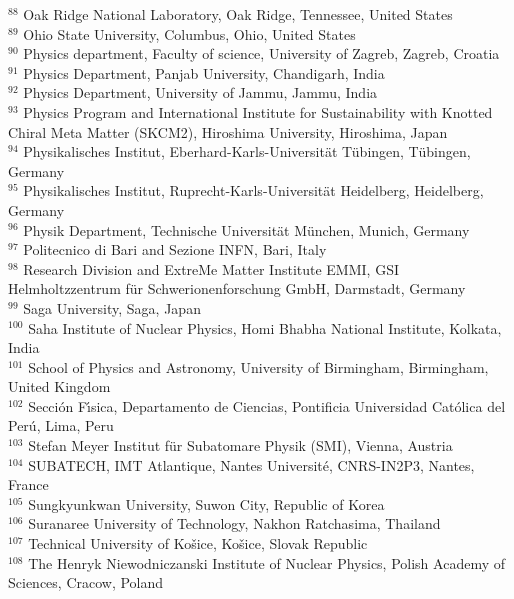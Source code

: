 \begin{flushleft}
$^{88}$ Oak Ridge National Laboratory, Oak Ridge, Tennessee, United States\\
$^{89}$ Ohio State University, Columbus, Ohio, United States\\
$^{90}$ Physics department, Faculty of science, University of Zagreb, Zagreb, Croatia\\
$^{91}$ Physics Department, Panjab University, Chandigarh, India\\
$^{92}$ Physics Department, University of Jammu, Jammu, India\\
$^{93}$ Physics Program and International Institute for Sustainability with Knotted Chiral Meta Matter (SKCM2), Hiroshima University, Hiroshima, Japan\\
$^{94}$ Physikalisches Institut, Eberhard-Karls-Universit\"{a}t T\"{u}bingen, T\"{u}bingen, Germany\\
$^{95}$ Physikalisches Institut, Ruprecht-Karls-Universit\"{a}t Heidelberg, Heidelberg, Germany\\
$^{96}$ Physik Department, Technische Universit\"{a}t M\"{u}nchen, Munich, Germany\\
$^{97}$ Politecnico di Bari and Sezione INFN, Bari, Italy\\
$^{98}$ Research Division and ExtreMe Matter Institute EMMI, GSI Helmholtzzentrum f\"ur Schwerionenforschung GmbH, Darmstadt, Germany\\
$^{99}$ Saga University, Saga, Japan\\
$^{100}$ Saha Institute of Nuclear Physics, Homi Bhabha National Institute, Kolkata, India\\
$^{101}$ School of Physics and Astronomy, University of Birmingham, Birmingham, United Kingdom\\
$^{102}$ Secci\'{o}n F\'{\i}sica, Departamento de Ciencias, Pontificia Universidad Cat\'{o}lica del Per\'{u}, Lima, Peru\\
$^{103}$ Stefan Meyer Institut f\"{u}r Subatomare Physik (SMI), Vienna, Austria\\
$^{104}$ SUBATECH, IMT Atlantique, Nantes Universit\'{e}, CNRS-IN2P3, Nantes, France\\
$^{105}$ Sungkyunkwan University, Suwon City, Republic of Korea\\
$^{106}$ Suranaree University of Technology, Nakhon Ratchasima, Thailand\\
$^{107}$ Technical University of Ko\v{s}ice, Ko\v{s}ice, Slovak Republic\\
$^{108}$ The Henryk Niewodniczanski Institute of Nuclear Physics, Polish Academy of Sciences, Cracow, Poland\\

\end{flushleft}

